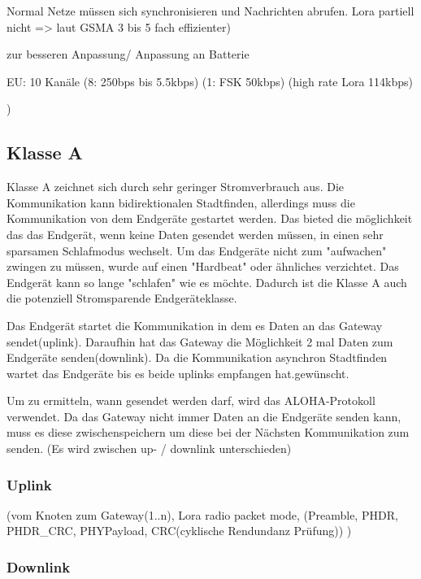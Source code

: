 \documentclass[a4paper,12pt]{article}
\begin{document}
        Normal Netze müssen sich synchronisieren und Nachrichten abrufen. Lora partiell nicht => laut GSMA 3 bis 5 fach effizienter)
    
        zur besseren Anpassung/ Anpassung an Batterie
        
        EU: 10 Kanäle (8: 250bps bis 5.5kbps) (1: FSK 50kbps) (high rate Lora 114kbps)

        )
        \subsection{Klasse A}\label{sec:ClassA}
            Klasse A zeichnet sich durch sehr geringer Stromverbrauch aus. Die Kommunikation kann bidirektionalen Stadtfinden, allerdings muss die Kommunikation von dem Endgeräte gestartet werden. Das bieted die möglichkeit das das Endgerät, wenn keine Daten gesendet werden müssen, in einen sehr
            sparsamen Schlafmodus wechselt. Um das Endgeräte nicht zum "aufwachen" zwingen zu müssen, wurde auf einen "Hardbeat" oder ähnliches verzichtet. Das Endgerät kann so lange "schlafen" wie es möchte. Dadurch ist die Klasse A auch die potenziell Stromsparende Endgeräteklasse.
            
            Das Endgerät startet die Kommunikation in dem es Daten an das Gateway sendet(uplink). Daraufhin hat das Gateway die Möglichkeit 2 mal Daten zum Endgeräte senden(downlink). Da die Kommunikation asynchron Stadtfinden wartet das Endgeräte bis es beide uplinks empfangen hat.gewünscht.
            
            Um zu ermitteln, wann gesendet werden darf, wird das ALOHA-Protokoll verwendet.
            Da das Gateway nicht immer Daten an die Endgeräte senden kann, muss es diese zwischenspeichern um diese bei der Nächsten Kommunikation zum senden.
            \cite{LoRaSpec}(Es wird zwischen up- / downlink unterschieden)

            \subsubsection{Uplink}

                \cite{LoRaSpec} 
                    (vom Knoten zum Gateway(1..n), Lora radio packet mode, (Preamble, PHDR, PHDR\_CRC, PHYPayload, CRC(cyklische Rendundanz Prüfung))
                 )

            \subsubsection{Downlink}
\end{document}
